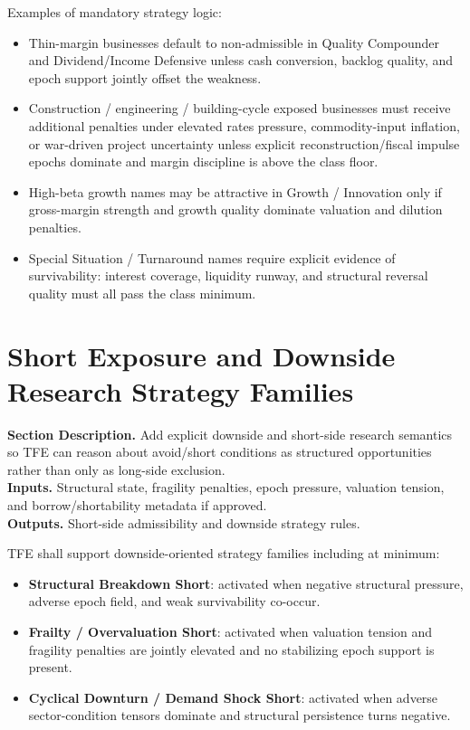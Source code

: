 \documentclass[11pt]{report}
\newcommand{\meta}[3]{\textbf{Section Description.} #1\\
\textbf{Inputs.} #2\\
\textbf{Outputs.} #3\par}
\begin{document}
Examples of mandatory strategy logic:
\begin{itemize}
    \item Thin-margin businesses default to non-admissible in Quality Compounder and Dividend/Income Defensive unless cash conversion, backlog quality, and epoch support jointly offset the weakness.
    \item Construction / engineering / building-cycle exposed businesses must receive additional penalties under elevated rates pressure, commodity-input inflation, or war-driven project uncertainty unless explicit reconstruction/fiscal impulse epochs dominate and margin discipline is above the class floor.
    \item High-beta growth names may be attractive in Growth / Innovation only if gross-margin strength and growth quality dominate valuation and dilution penalties.
    \item Special Situation / Turnaround names require explicit evidence of survivability: interest coverage, liquidity runway, and structural reversal quality must all pass the class minimum.
\end{itemize}



\section{Short Exposure and Downside Research Strategy Families}
\meta{Add explicit downside and short-side research semantics so TFE can reason about avoid/short conditions as structured opportunities rather than only as long-side exclusion.}{Structural state, fragility penalties, epoch pressure, valuation tension, and borrow/shortability metadata if approved.}{Short-side admissibility and downside strategy rules.}

TFE shall support downside-oriented strategy families including at minimum:
\begin{itemize}
    \item \textbf{Structural Breakdown Short}: activated when negative structural pressure, adverse epoch field, and weak survivability co-occur.
    \item \textbf{Frailty / Overvaluation Short}: activated when valuation tension and fragility penalties are jointly elevated and no stabilizing epoch support is present.
    \item \textbf{Cyclical Downturn / Demand Shock Short}: activated when adverse sector-condition tensors dominate and structural persistence turns negative.
\end{itemize}
\end{document}
